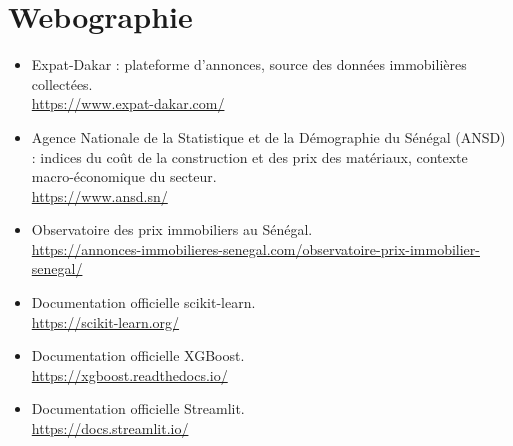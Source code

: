 \chapter*{Webographie}

\begin{itemize}
  \item Expat-Dakar : plateforme d'annonces, source des données immobilières collectées.\\
  \url{https://www.expat-dakar.com/}
  \item Agence Nationale de la Statistique et de la Démographie du Sénégal (ANSD) : indices du
  coût de la construction et des prix des matériaux, contexte macro-économique du secteur.\\
  \url{https://www.ansd.sn/}
  \item Observatoire des prix immobiliers au Sénégal.\\
  \url{https://annonces-immobilieres-senegal.com/observatoire-prix-immobilier-senegal/}
  \item Documentation officielle scikit-learn.\\
  \url{https://scikit-learn.org/}
  \item Documentation officielle XGBoost.\\
  \url{https://xgboost.readthedocs.io/}
  \item Documentation officielle Streamlit.\\
  \url{https://docs.streamlit.io/}
\end{itemize}
